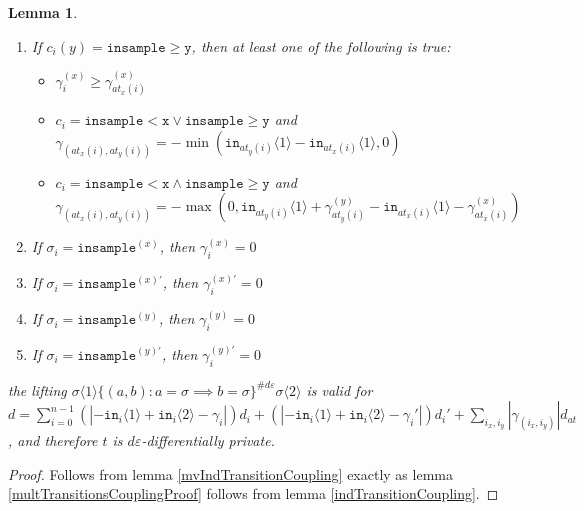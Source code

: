 \documentclass[12pt]{article}
\newcommand{\gguard}[1][x]{\texttt{insample}\geq#1}
\newcommand{\lguard}[1][x]{\texttt{insample} < #1}
\newcommand{\brangle}[1]{\langle#1 \rangle}
\newtheorem{lemma}[thm]{Lemma}
\theoremstyle{definition}
\begin{document}
\begin{lemma}
\begin{enumerate}
\begin{itemize}
            \item $\gamma_i^{(y)}\leq \gamma^{(y)}_{at_y(i)}$
            \item $c_i = \gguard[\texttt{x}]\lor\lguard[\texttt{y}]$ and $\gamma_{(at_x(i), at_y(i))} = -\min(\texttt{in}_{at_x(i)}\brangle{1}-\texttt{in}_{at_y(i)}\brangle{1}, 0)$
            \item $c_i = \gguard[\texttt{x}]\land\lguard[\texttt{y}]$ and $\gamma_{(at_x(i), at_y(i))} = -\max(0, \texttt{in}_{at_x(i)}\brangle{1}+ \gamma_{at_x(i)}^{(x)}-\texttt{in}_{at_y(i)}\brangle{1}-\gamma_{at_y(i)}^{(y)})$
        \end{itemize}
        \item If $c_i(y) = \gguard[\texttt{y}]$, then at least one of the following is true: \begin{itemize}
            \item $\gamma_i^{(x)}\geq \gamma^{(x)}_{at_x(i)}$
            \item $c_i = \lguard[\texttt{x}]\lor\gguard[\texttt{y}]$ and $\gamma_{(at_x(i), at_y(i))} = -\min(\texttt{in}_{at_y(i)}\brangle{1}-\texttt{in}_{at_x(i)}\brangle{1}, 0)$
            \item $c_i = \lguard[\texttt{x}]\land\gguard[\texttt{y}]$ and $\gamma_{(at_x(i), at_y(i))} = -\max(0, \texttt{in}_{at_y(i)}\brangle{1}+ \gamma_{at_y(i)}^{(y)}-\texttt{in}_{at_x(i)}\brangle{1}-\gamma_{at_x(i)}^{(x)})$
        \end{itemize}
        \item If $\sigma_i = \texttt{insample}^{(x)}$, then $\gamma_i^{(x)}=0$
        \item If $\sigma_i = \texttt{insample}^{(x)\prime}$, then $\gamma_i^{(x)\prime}=0$
        \item If $\sigma_i = \texttt{insample}^{(y)}$, then $\gamma_i^{(y)}=0$
        \item If $\sigma_i = \texttt{insample}^{(y)\prime}$, then $\gamma_i^{(y)\prime}=0$
    \end{enumerate}
      the lifting $\sigma\brangle{1}\{(a, b): a=\sigma\implies b=\sigma\}^{\#d\varepsilon}\sigma\brangle{2}$ is valid for $d = \sum_{i=0}^{n-1}(|-\texttt{in}_i\brangle{1}+\texttt{in}_i\brangle{2}-\gamma_i|)d_i+(|-\texttt{in}_i\brangle{1}+\texttt{in}_i\brangle{2}-\gamma_i'|)d_i' + \sum_{i_x, i_y}|\gamma_{(i_x, i_y)}|d_{at}$, and therefore $t$ is $d\varepsilon$-differentially private. 
\end{lemma}
\begin{proof}
    Follows from lemma \ref{mvIndTransitionCoupling} exactly as lemma \ref{multTransitionsCouplingProof} follows from lemma \ref{indTransitionCoupling}.
\end{proof}
\end{document}
